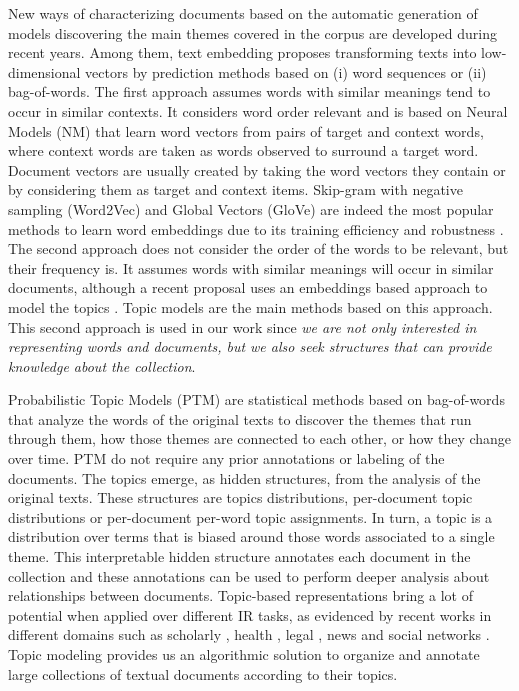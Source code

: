 New ways of characterizing documents based on the automatic generation of models discovering the main themes covered in the corpus are developed during recent years. Among them, text embedding proposes transforming texts into low-dimensional vectors by prediction methods based on (i) word sequences or (ii) bag-of-words. The first approach assumes words with similar meanings tend to occur in similar contexts. It considers word order relevant and is based on Neural Models (NM) that learn word vectors from pairs of target and context words, where context words are taken as words observed to surround a target word. Document vectors are usually created by taking the word vectors they contain or by considering them as target and context items. Skip-gram with negative sampling (Word2Vec) \citep{Mikolov2013c} and Global Vectors (GloVe) \citep{pennington2014} are indeed the most popular methods to learn word embeddings due to its training efficiency and robustness \citep{levy2015}. The second approach does not consider the order of the words to be relevant, but their frequency is. It assumes words with similar meanings will occur in similar documents, although a recent proposal uses an embeddings based approach to model the topics \citep{Dieng2020TopicMI}. Topic models \citep{Deerwester1990, Hofmann2001, Blei2003} are the main methods based on this approach. This second approach is used in our work since \textit{we are not only interested in representing words and documents, but we also seek structures that can provide knowledge about the collection}.

Probabilistic Topic Models (PTM) \citep{Hofmann2001,Blei2003} are statistical methods based on bag-of-words that analyze the words of the original texts to discover the themes that run through them, how those themes are connected to each other, or how they change over time. PTM do not require any prior annotations or labeling of the documents. The topics emerge, as hidden structures, from the analysis of the original texts. These structures are topics distributions, per-document topic distributions or per-document per-word topic assignments. In turn, a topic is a distribution over terms that is biased around those words associated to a single theme. This interpretable hidden structure annotates each document in the collection and these annotations can be used to perform deeper analysis about relationships between documents. Topic-based representations bring a lot of potential when applied over different IR tasks, as evidenced by recent works in different domains such as scholarly  \citep{Gatti2015}, health \citep{Lu2016, TapiNzali2017}, legal \citep{ONeill2017, Greene2016}, news \citep{He2017} and social networks \citep{Cheng2014a}. Topic modeling provides us an algorithmic solution to organize and annotate large collections of textual documents according to their topics.

